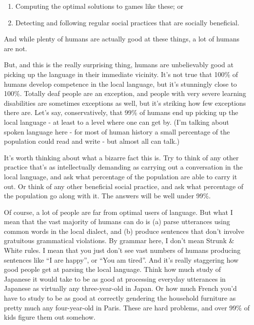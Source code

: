\documentclass[11pt,]{article}
\providecommand{\tightlist}{%
  \setlength{\itemsep}{0pt}\setlength{\parskip}{0pt}}
\begin{document}
\begin{enumerate}
\def\labelenumi{\arabic{enumi}.}
\tightlist
\item
  Computing the optimal solutions to games like these; or
\item
  Detecting and following regular social practices that are socially
  beneficial.
\end{enumerate}

And while plenty of humans are actually good at these things, a lot of
humans are not.

But, and this is the really surprising thing, humans are unbelievably
good at picking up the language in their immediate vicinity. It's not
true that 100\% of humans develop competence in the local language, but
it's stunningly close to 100\%. Totally deaf people are an exception,
and people with very severe learning disabilities are sometimes
exceptions as well, but it's striking how few exceptions there are.
Let's say, conservatively, that 99\% of humans end up picking up the
local language - at least to a level where one can get by. (I'm talking
about spoken language here - for most of human history a small
percentage of the population could read and write - but almost all can
talk.)

It's worth thinking about what a bizarre fact this is. Try to think of
any other practice that's as intellectually demanding as carrying out a
conversation in the local language, and ask what percentage of the
population are able to carry it out. Or think of any other beneficial
social practice, and ask what percentage of the population go along with
it. The answers will be well under 99\%.

Of course, a lot of people are far from optimal users of language. But
what I mean that the vast majority of humans can do is (a) parse
utterances using common words in the local dialect, and (b) produce
sentences that don't involve gratuitous grammatical violations. By
grammar here, I don't mean Strunk \& White rules. I mean that you just
don't see vast numbers of humans producing sentences like ``I are
happy'', or ``You am tired''. And it's really staggering how good people
get at parsing the local language. Think how much study of Japanese it
would take to be as good at processing everyday utterances in Japanese
as virtually any three-year-old in Japan. Or how much French you'd have
to study to be as good at correctly gendering the household furniture as
pretty much any four-year-old in Paris. These are hard problems, and
over 99\% of kids figure them out somehow.
\end{document}
